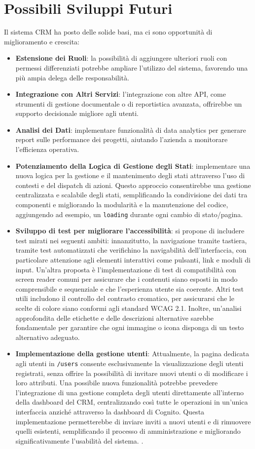 \documentclass[target=bach,aauheader=,style=]{thud}
\begin{document}
\section{Possibili Sviluppi Futuri}
Il sistema CRM ha posto delle solide basi, ma ci sono opportunità di miglioramento e crescita:
\begin{itemize}
    \item \textbf{Estensione dei Ruoli}: la possibilità di aggiungere ulteriori ruoli con permessi differenziati potrebbe ampliare l'utilizzo del sistema, favorendo una più ampia delega delle responsabilità.
    \item \textbf{Integrazione con Altri Servizi}: l'integrazione con altre API, come strumenti di gestione documentale o di reportistica avanzata, offrirebbe un supporto decisionale migliore agli utenti.
    \item \textbf{Analisi dei Dati}: implementare funzionalità di data analytics per generare report sulle performance dei progetti, aiutando l'azienda a monitorare l'efficienza operativa.
    \item \textbf{Potenziamento della Logica di Gestione degli Stati}: implementare una nuova logica per la gestione e il mantenimento degli stati attraverso l'uso di contesti e del dispatch di azioni. Questo approccio consentirebbe una gestione centralizzata e scalabile degli stati, semplificando la condivisione dei dati tra componenti e migliorando la modularità e la manutenzione del codice, aggiungendo ad esempio, un \texttt{loading} durante ogni cambio di stato/pagina.
    \item \textbf{Sviluppo di test per migliorare l'accessibilità}: si propone di includere test mirati nei seguenti ambiti: innanzitutto, la navigazione tramite tastiera, tramite test automatizzati che verifichino la navigabilità dell'interfaccia, con particolare attenzione agli elementi interattivi come pulsanti, link e moduli di input. Un'altra proposta è l'implementazione di test di compatibilità con screen reader comuni per assicurare che i contenuti siano esposti in modo comprensibile e sequenziale e che l'esperienza utente sia coerente. Altri test utili includono il controllo del contrasto cromatico, per assicurarsi che le scelte di colore siano conformi agli standard WCAG 2.1. Inoltre, un'analisi approfondita delle etichette e delle descrizioni alternative sarebbe fondamentale per garantire che ogni immagine o icona disponga di un testo alternativo adeguato. 
    \item \textbf{Implementazione della gestione utenti}: Attualmente, la pagina dedicata agli utenti in \texttt{/users} consente esclusivamente la visualizzazione degli utenti registrati, senza offrire la possibilità di invitare nuovi utenti o di modificare i loro attributi. Una possibile nuova funzionalità potrebbe prevedere l'integrazione di una gestione completa degli utenti direttamente all'interno della dashboard del CRM, centralizzando così tutte le operazioni in un'unica interfaccia anziché attraverso la dashboard di Cognito. Questa implementazione permetterebbe di inviare inviti a nuovi utenti e di rimuovere quelli esistenti, semplificando il processo di amministrazione e migliorando significativamente l'usabilità del sistema.
    .


\end{itemize}
\end{document}

